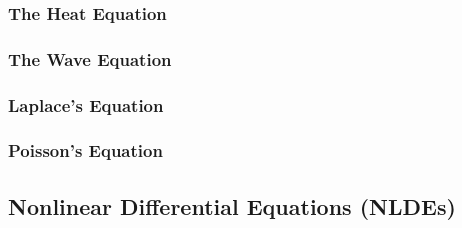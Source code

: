     \subsubsection{The Heat Equation} %
    \subsubsection{The Wave Equation} %
    \subsubsection{Laplace's Equation} %
    \subsubsection{Poisson's Equation} %
\subsection{Nonlinear Differential Equations (NLDEs)}
%